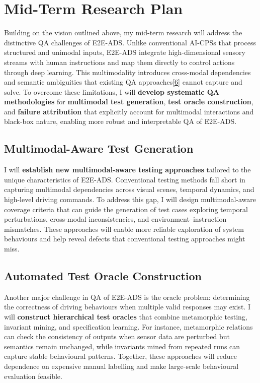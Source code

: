 \documentclass[12pt,a4paper]{article}
\begin{document}
\section{Mid-Term Research Plan}

Building on the vision outlined above, my mid-term research will address the distinctive QA challenges of E2E-ADS. Unlike conventional AI-CPSs that process structured and unimodal inputs, E2E-ADS integrate high-dimensional sensory streams with human instructions and map them directly to control actions through deep learning. This multimodality introduces cross-modal dependencies and semantic ambiguities that existing QA approaches\hyperlink{paper6}{[6]} cannot capture and solve. To overcome these limitations, I will \textbf{develop systematic QA methodologies} for \textbf{multimodal test generation}, \textbf{test oracle construction}, and \textbf{failure attribution} that explicitly account for multimodal interactions and black-box nature, enabling more robust and interpretable QA of E2E-ADS.

\subsection{Multimodal-Aware Test Generation}

I will \textbf{establish new multimodal-aware testing approaches} tailored to the unique characteristics of E2E-ADS. Conventional testing methods fall short in capturing multimodal dependencies across visual scenes, temporal dynamics, and high-level driving commands. To address this gap, I will design multimodal-aware coverage criteria that can guide the generation of test cases exploring temporal perturbations, cross-modal inconsistencies, and environment–instruction mismatches. These approaches will enable more reliable exploration of system behaviours and help reveal defects that conventional testing approaches might miss.

\subsection{Automated Test Oracle Construction}

Another major challenge in QA of E2E-ADS is the oracle problem: determining the correctness of driving behaviours when multiple valid responses may exist. I will \textbf{construct hierarchical test oracles} that combine metamorphic testing, invariant mining, and specification learning. For instance, metamorphic relations can check the consistency of outputs when sensor data are perturbed but semantics remain unchanged, while invariants mined from repeated runs can capture stable behavioural patterns. Together, these approaches will reduce dependence on expensive manual labelling and make large-scale behavioural evaluation feasible.
\end{document}
